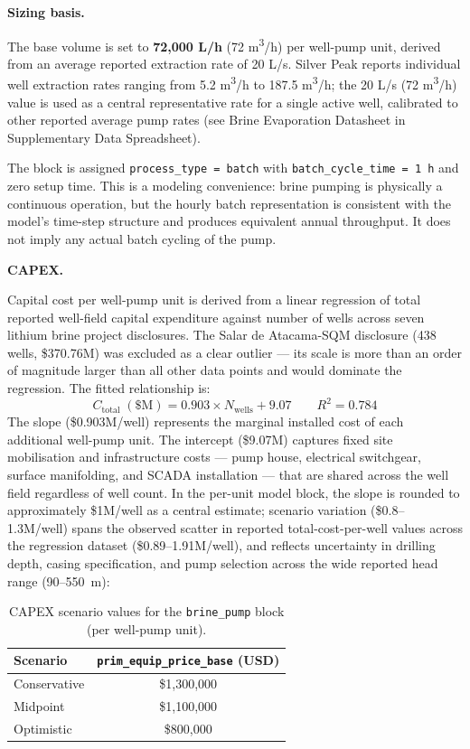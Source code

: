 \medskip
\noindent\textbf{Sizing basis.}\quad

The base volume is set to \textbf{72,000 L/h} (72 \si{m^3/h}) per well-pump unit, derived from an average reported extraction rate of 20 L/s. Silver Peak reports individual well extraction rates ranging from 5.2 \si{m^3/h} to 187.5 \si{m^3/h}; the 20 L/s (72 \si{m^3/h}) value is used as a central representative rate for a single active well, calibrated to other reported average pump rates (see Brine Evaporation Datasheet in Supplementary Data Spreadsheet).

The block is assigned \texttt{process\_type = batch} with \texttt{batch\_cycle\_time = 1 h} and zero setup time. This is a modeling convenience: brine pumping is physically a continuous operation, but the hourly batch representation is consistent with the model's time-step structure and produces equivalent annual throughput. It does not imply any actual batch cycling of the pump.

\medskip
\noindent\textbf{CAPEX.}\quad

Capital cost per well-pump unit is derived from a linear regression of total reported well-field capital expenditure against number of wells across seven lithium brine project disclosures. The Salar de Atacama-SQM disclosure (438 wells, \$370.76M) was excluded as a clear outlier --- its scale is more than an order of magnitude larger than all other data points and would dominate the regression. The fitted relationship is:
\[
  C_\text{total}\;(\$\text{M}) = 0.903 \times N_\text{wells} + 9.07 \qquad R^2 = 0.784
\]
The slope (\$0.903M/well) represents the marginal installed cost of each additional well-pump unit. The intercept (\$9.07M) captures fixed site mobilisation and infrastructure costs --- pump house, electrical switchgear, surface manifolding, and SCADA installation --- that are shared across the well field regardless of well count. In the per-unit model block, the slope is rounded to approximately \$1M/well as a central estimate; scenario variation (\$0.8--1.3M/well) spans the observed scatter in reported total-cost-per-well values across the regression dataset (\$0.89--1.91M/well), and reflects uncertainty in drilling depth, casing specification, and pump selection across the wide reported head range (90--550~m):

\begin{table}[h!]
\caption{CAPEX scenario values for the \texttt{brine\_pump} block (per well-pump unit).}
\centering
\begin{tabular}{lc}
\toprule
\textbf{Scenario} & \texttt{prim\_equip\_price\_base} (USD) \\
\midrule
Conservative & \$1,300,000 \\
Midpoint     & \$1,100,000 \\
Optimistic   & \$800,000    \\
\bottomrule
\end{tabular}
\end{table}

